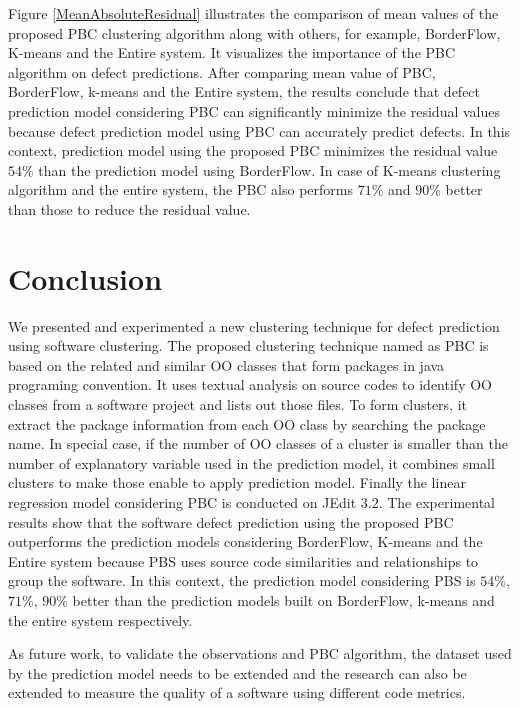 \documentclass[12pt]{report}
\begin{document}
Figure \ref{MeanAbsoluteResidual} illustrates the comparison of mean values of the proposed PBC clustering algorithm along with others, for example, BorderFlow, K-means and the Entire system. It visualizes the importance of the PBC algorithm on defect predictions. After comparing mean value of PBC, BorderFlow, k-means and the Entire system, the results conclude that defect prediction model considering PBC can significantly minimize the residual values because defect prediction model using PBC can accurately predict defects. In this context, prediction model using the proposed PBC minimizes the residual value $54\%$ than the prediction model using BorderFlow. In case of K-means clustering algorithm and the entire system, the PBC also performs $71\%$ and $90\%$ better than those to reduce the residual value. 


\section{Conclusion}

We presented and experimented a new clustering technique for defect prediction using software clustering. The proposed clustering technique named as PBC is based on the related and similar OO classes that form packages in java programing convention. It uses textual analysis on source codes to identify OO classes from a software project and lists out those files. To form clusters, it extract the package information from each OO class by searching the package name. In special case, if the number of OO classes of a cluster is smaller than the number of explanatory variable used in the prediction model, it combines small clusters to make those enable to apply prediction model. Finally the linear regression model considering PBC is conducted on JEdit $3.2$. The experimental results show that the software defect prediction using the proposed PBC outperforms the prediction models considering BorderFlow, K-means and the Entire system because PBS uses source code similarities and relationships to group the software. In this context, the prediction model considering PBS is  $54\%$, $71\%$, $90\%$ better than the prediction models built on BorderFlow, k-means and the entire system respectively. 

As future work, to validate the observations and PBC algorithm, the dataset used by the prediction model needs to be extended and the research can also be extended to measure the quality of a software using different code metrics.  
\end{document}
